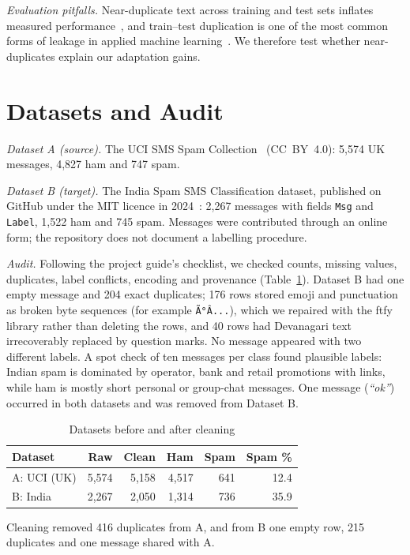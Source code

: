 \documentclass[conference]{IEEEtran}
\begin{document}
\textit{Evaluation pitfalls.} Near-duplicate text across training and test sets inflates measured performance~\cite{lee2022}, and train--test duplication is one of the most common forms of leakage in applied machine learning~\cite{kapoor2023}. We therefore test whether near-duplicates explain our adaptation gains.

\section{Datasets and Audit}
\textit{Dataset A (source).} The UCI SMS Spam Collection~\cite{almeida2011} (CC~BY~4.0): 5,574 UK messages, 4,827 ham and 747 spam.

\textit{Dataset B (target).} The India Spam SMS Classification dataset, published on GitHub under the MIT licence in 2024~\cite{indiasms}: 2,267 messages with fields \texttt{Msg} and \texttt{Label}, 1,522 ham and 745 spam. Messages were contributed through an online form; the repository does not document a labelling procedure.

\textit{Audit.} Following the project guide's checklist, we checked counts, missing values, duplicates, label conflicts, encoding and provenance (Table~\ref{tab:data}). Dataset B had one empty message and 204 exact duplicates; 176 rows stored emoji and punctuation as broken byte sequences (for example \texttt{Ã°Â...}), which we repaired with the ftfy library rather than deleting the rows, and 40 rows had Devanagari text irrecoverably replaced by question marks. No message appeared with two different labels. A spot check of ten messages per class found plausible labels: Indian spam is dominated by operator, bank and retail promotions with links, while ham is mostly short personal or group-chat messages. One message (\textit{``ok''}) occurred in both datasets and was removed from Dataset B.

\begin{table}[t]
\centering
\caption{Datasets before and after cleaning}
\label{tab:data}
\begin{tabular}{lrrrrr}
\toprule
Dataset & Raw & Clean & Ham & Spam & Spam \% \\
\midrule
A: UCI (UK) & 5,574 & 5,158 & 4,517 & 641 & 12.4 \\
B: India & 2,267 & 2,050 & 1,314 & 736 & 35.9 \\
\bottomrule
\end{tabular}
\vspace{2pt}

\footnotesize Cleaning removed 416 duplicates from A, and from B one empty row, 215 duplicates and one message shared with A.
\end{table}
\end{document}
